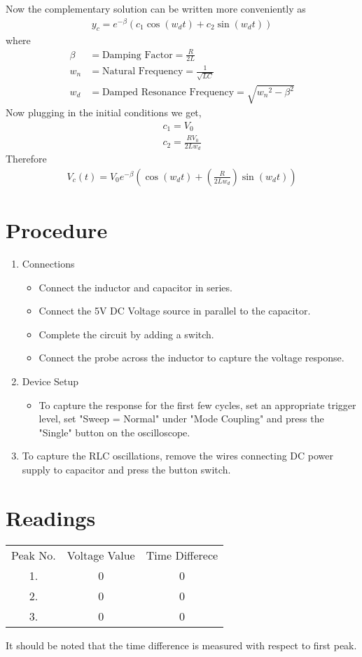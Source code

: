 \documentclass[a4paper,12pt]{article}
\begin{document}
Now the complementary solution can be written more conveniently as
\begin{align}
  y_c = e^{-\beta}(c_1 \cos(w_d t) + c_2 \sin(w_d t))
\end{align}
where
\begin{align}
  \beta &= \text{Damping Factor} = \frac{R}{2L}\\
  w_n &= \text{Natural Frequency} = \frac{1}{\sqrt{LC}}\\
  w_d &= \text{Damped Resonance Frequency} = \sqrt{{w_n}^2 - \beta ^ 2}
\end{align}
Now plugging in the initial conditions we get,
\begin{align}
  c_1 = V_0\\
  c_2 = \frac{RV_0}{2Lw_d}
\end{align}
Therefore 
\begin{align}
  V_c(t) = V_0e^{-\beta}(\cos(w_d t) + \left(\frac{R}{2Lw_d}\right)\sin(w_d t))
\end{align}
\section{Procedure}
\begin{enumerate}
\item Connections
\begin{itemize}
\item Connect the inductor and capacitor in series.
\item Connect the 5V DC Voltage source in parallel to the capacitor.
\item Complete the circuit by adding a switch.
\item Connect the probe across the inductor to capture the voltage response.
\end{itemize}
\item Device Setup
\begin{itemize}
\item To capture the response for the first few cycles, set an appropriate trigger level, set "Sweep = Normal" under "Mode Coupling" and press the "Single" button on the oscilloscope.
\end{itemize}
\item To capture the RLC oscillations, remove the wires connecting DC power supply to capacitor and press the button switch.
\end{enumerate}
\section{Readings}
\begin{table}[htbp]
  \centering\begin{tabular}{|c|c|c|}
    \hline
    Peak No. & Voltage Value & Time Differece\\
    1. & 0 & 0 \\
    \hline
    2. & 0 & 0 \\
    \hline
    3. & 0 & 0 \\
    \hline
  \end{tabular}
\end{table}
It should be noted that the time difference is measured with respect to first peak.
\end{document}
